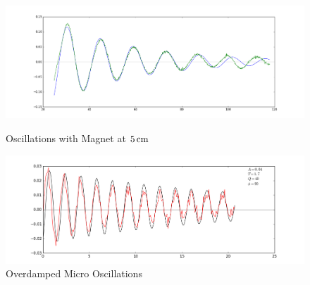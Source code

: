 \documentclass[11pt]{article}   	%
\begin{document}
    \begin{figure}
        \begin{minipage}{0.49\textwidth}
            \centering
            \includegraphics[width=1.1\textwidth]{blow5better.png}
            \caption{Oscillations with Magnet at $\unit[5]{cm}$}
            \label{fig:5cm}
        \end{minipage}
        \begin{minipage}{0.49\textwidth}
            \centering
            \includegraphics[width=1.1\textwidth]{overdampedmicrooscillations1.png}
            \caption{Overdamped Micro Oscillations}
            \label{fig:overdamped}
        \end{minipage}
    \end{figure}
\end{document}
